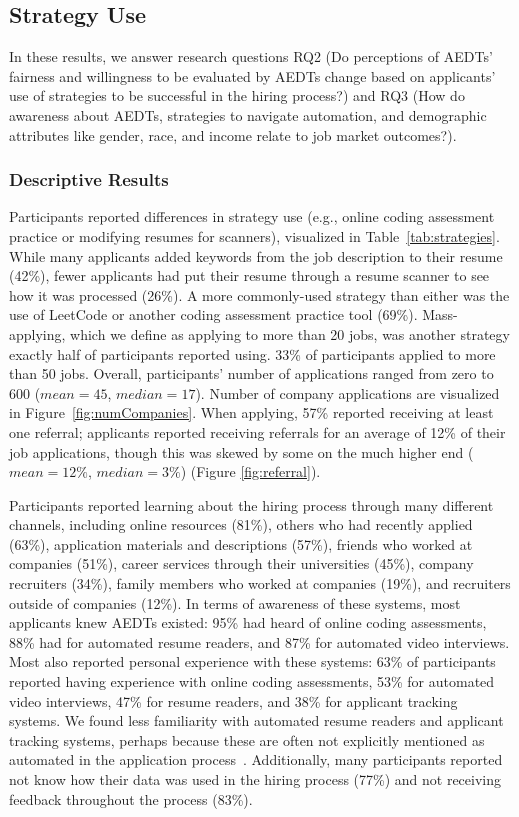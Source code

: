 \subsection{Strategy Use}

In these results, we answer research questions RQ2 (Do perceptions of AEDTs' fairness and willingness to be evaluated by AEDTs change based on applicants' use of strategies to be successful in the hiring process?) and RQ3 (How do awareness about AEDTs, strategies to navigate automation, and demographic attributes like gender, race, and income relate to job market outcomes?).

\subsubsection{Descriptive Results}
Participants reported differences in strategy use (e.g., online coding assessment practice or modifying resumes for scanners), visualized in Table~\ref{tab:strategies}. While many applicants added keywords from the job description to their resume (42\%), fewer applicants had put their resume through a resume scanner to see how it was processed (26\%). A more commonly-used strategy than either was the use of LeetCode or another coding assessment practice tool (69\%). 
Mass-applying, which we define as applying to more than 20 jobs, was another strategy exactly half of participants reported using. 33\% of participants applied to more than 50 jobs. Overall, participants' number of applications ranged from zero to 600 ($mean = 45$, $median = 17$). Number of company applications are visualized in Figure~\ref{fig:numCompanies}. When applying, 57\% reported receiving at least one referral; applicants reported receiving referrals for an average of 12\% of their job applications, though this was skewed by some on the much higher end ($mean = 12\%$, $median = 3\%$) (Figure \ref{fig:referral}). 

Participants reported learning about the hiring process through many different channels, including online resources (81\%), others who had recently applied (63\%), application materials and descriptions (57\%), friends who worked at companies (51\%), career services through their universities (45\%), company recruiters (34\%), family members who worked at companies (19\%), and recruiters outside of companies (12\%). 
In terms of awareness of these systems, most applicants knew AEDTs existed: 95\% had heard of online coding assessments, 88\% had for automated resume readers, and 87\% for automated video interviews. Most also reported personal experience with these systems: 63\% of participants reported having experience with online coding assessments, 53\% for automated video interviews, 47\% for resume readers, and 38\% for applicant tracking systems. We found less familiarity with automated resume readers and applicant tracking systems, perhaps because these are often not explicitly mentioned as automated in the application process~\cite{schumann2020we, wilson2021building}. Additionally, many participants reported not know how their data was used in the hiring process (77\%) and not receiving feedback throughout the process (83\%).

